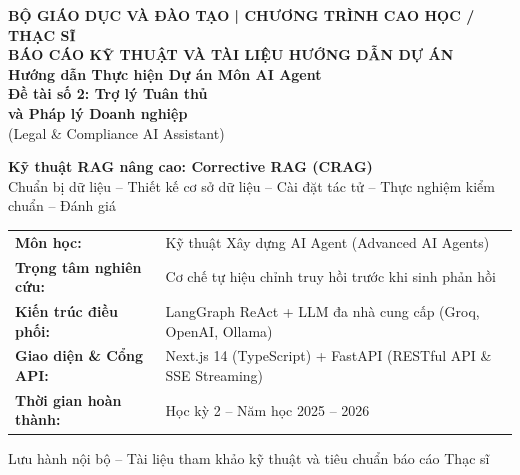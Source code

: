 \begin{titlepage}
\begin{center}
    \vspace*{0.8cm}
    
    {\large\bfseries BỘ GIÁO DỤC VÀ ĐÀO TẠO \quad | \quad CHƯƠNG TRÌNH CAO HỌC / THẠC SĨ}\\[0.3cm]
    {\large\bfseries BÁO CÁO KỸ THUẬT VÀ TÀI LIỆU HƯỚNG DẪN DỰ ÁN}\\[1.5cm]

    {\LARGE\bfseries Hướng dẫn Thực hiện Dự án Môn AI Agent}\\[0.5cm]
    {\Huge\bfseries Đề tài số 2: Trợ lý Tuân thủ\\và Pháp lý Doanh nghiệp}\\[0.4cm]
    {\Large (Legal \& Compliance AI Assistant)}\\[1.2cm]

    \begin{keypoint}
    \centering
    {\large\bfseries Kỹ thuật RAG nâng cao: Corrective RAG (CRAG)}\\[0.25cm]
    {\normalsize Chuẩn bị dữ liệu -- Thiết kế cơ sở dữ liệu -- Cài đặt tác tử -- Thực nghiệm kiểm chuẩn -- Đánh giá}
    \end{keypoint}

    \vfill

    \begin{table}[h!]
    \centering
    \renewcommand{\arraystretch}{1.35}
    \begin{tabular}{lp{10.5cm}}
        \textbf{Môn học:} & Kỹ thuật Xây dựng AI Agent (Advanced AI Agents) \\
        \textbf{Trọng tâm nghiên cứu:} & Cơ chế tự hiệu chỉnh truy hồi trước khi sinh phản hồi \\
        \textbf{Kiến trúc điều phối:} & LangGraph ReAct + LLM đa nhà cung cấp (Groq, OpenAI, Ollama) \\
        \textbf{Giao diện \& Cổng API:} & Next.js 14 (TypeScript) + FastAPI (RESTful API \& SSE Streaming) \\
        \textbf{Thời gian hoàn thành:} & Học kỳ 2 -- Năm học 2025 -- 2026 \\
    \end{tabular}
    \end{table}

    \vfill
    \vspace*{0.5cm}
    {\small Lưu hành nội bộ -- Tài liệu tham khảo kỹ thuật và tiêu chuẩn báo cáo Thạc sĩ}
    \vspace*{0.5cm}
\end{center}
\end{titlepage}
